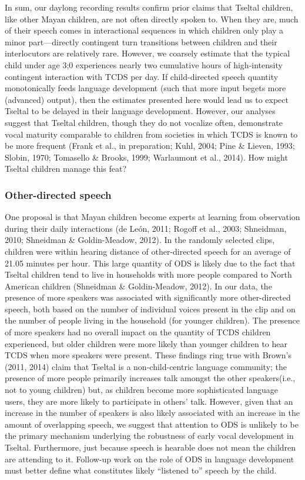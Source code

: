 \documentclass[floatsintext,man]{apa6}
\theoremstyle{definition}
\theoremstyle{definition}
\theoremstyle{definition}
\theoremstyle{remark}
\begin{document}
In sum, our daylong recording results confirm prior claims that Tseltal
children, like other Mayan children, are not often directly spoken to.
When they are, much of their speech comes in interactional sequences in
which children only play a minor part---directly contingent turn
transitions between children and their interlocutors are relatively
rare. However, we coarsely estimate that the typical child under age 3;0
experiences nearly two cumulative hours of high-intensity contingent
interaction with TCDS per day. If child-directed speech quantity
monotonically feeds language development (such that more input begets
more (advanced) output), then the estimates presented here would lead us
to expect Tseltal to be delayed in their language development. However,
our analyses suggest that Tseltal children, though they do not vocalize
often, demonstrate vocal maturity comparable to children from societies
in which TCDS is known to be more frequent (Frank et al., in
preparation; Kuhl, 2004; Pine \& Lieven, 1993; Slobin, 1970; Tomasello
\& Brooks, 1999; Warlaumont et al., 2014). How might Tseltal children
manage this feat?

\subsubsection{Other-directed speech}\label{other-directed-speech}

One proposal is that Mayan children become experts at learning from
observation during their daily interactions (de León, 2011; Rogoff et
al., 2003; Shneidman, 2010; Shneidman \& Goldin-Meadow, 2012). In the
randomly selected clips, children were within hearing distance of
other-directed speech for an average of 21.05 minutes per hour. This
large quantity of ODS is likely due to the fact that Tseltal children
tend to live in households with more people compared to North American
children (Shneidman \& Goldin-Meadow, 2012). In our data, the presence
of more speakers was associated with significantly more other-directed
speech, both based on the number of individual voices present in the
clip and on the number of people living in the household (for younger
children). The presence of more speakers had no overall impact on the
quantity of TCDS children experienced, but older children were more
likely than younger children to hear TCDS when more speakers were
present. These findings ring true with Brown's (2011, 2014) claim that
Tseltal is a non-child-centric language community; the presence of more
people primarily increases talk amongst the other speakers(i.e., not to
young children) but, as children become more sophisticated language
users, they are more likely to participate in others' talk. However,
given that an increase in the number of speakers is also likely
associated with an increase in the amount of overlapping speech, we
suggest that attention to ODS is unlikely to be the primary mechanism
underlying the robustness of early vocal development in Tseltal.
Furthermore, just because speech is hearable does not mean the children
are attending to it. Follow-up work on the role of ODS in language
development must better define what constitutes likely \enquote{listened
to} speech by the child.
\end{document}
